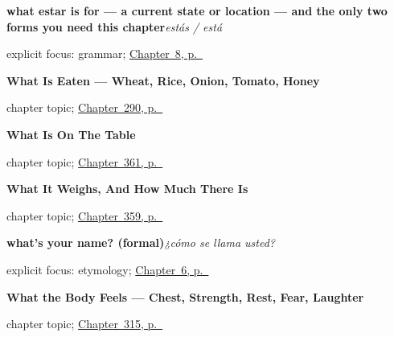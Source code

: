 \noindent\begin{minipage}[t]{\linewidth}
\raggedright
\textbf{what estar is for — a current state or location — and the only two forms you need this chapter}\enspace\emph{estás / está}\par
\footnotesize explicit focus: grammar; \hyperref[ch:how-are-you]{Chapter~8, p.~\pageref*{ch:how-are-you}}
\end{minipage}\par\smallskip

\noindent\begin{minipage}[t]{\linewidth}
\raggedright
\textbf{What Is Eaten --- Wheat, Rice, Onion, Tomato, Honey}\par
\footnotesize chapter topic; \hyperref[ch:lo-que-se-come]{Chapter~290, p.~\pageref*{ch:lo-que-se-come}}
\end{minipage}\par\smallskip

\noindent\begin{minipage}[t]{\linewidth}
\raggedright
\textbf{What Is On The Table}\par
\footnotesize chapter topic; \hyperref[ch:la-carne-y-la-leche]{Chapter~361, p.~\pageref*{ch:la-carne-y-la-leche}}
\end{minipage}\par\smallskip

\noindent\begin{minipage}[t]{\linewidth}
\raggedright
\textbf{What It Weighs, And How Much There Is}\par
\footnotesize chapter topic; \hyperref[ch:el-kilo-y-el-litro]{Chapter~359, p.~\pageref*{ch:el-kilo-y-el-litro}}
\end{minipage}\par\smallskip

\noindent\begin{minipage}[t]{\linewidth}
\raggedright
\textbf{what's your name? (formal)}\enspace\emph{¿cómo se llama usted?}\par
\footnotesize explicit focus: etymology; \hyperref[ch:asking-a-name]{Chapter~6, p.~\pageref*{ch:asking-a-name}}
\end{minipage}\par\smallskip

\noindent\begin{minipage}[t]{\linewidth}
\raggedright
\textbf{What the Body Feels --- Chest, Strength, Rest, Fear, Laughter}\par
\footnotesize chapter topic; \hyperref[ch:fuerza-y-risa]{Chapter~315, p.~\pageref*{ch:fuerza-y-risa}}
\end{minipage}\par\smallskip

